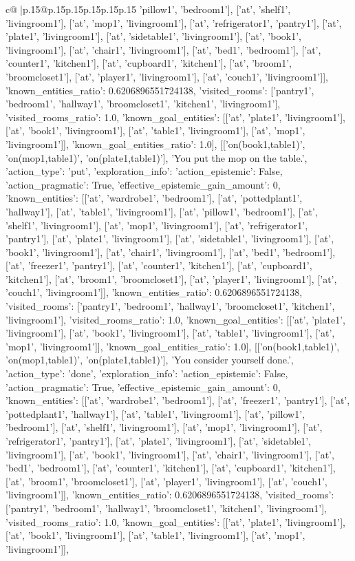 \documentclass{article}
\begin{document}
{\begin{supertabular}{c@{$\;$}|p{.15\linewidth}@{}p{.15\linewidth}p{.15\linewidth}p{.15\linewidth}p{.15\linewidth}p{.15\linewidth}}
{{{'pillow1', 'bedroom1'], ['at', 'shelf1', 'livingroom1'], ['at', 'mop1', 'livingroom1'], ['at', 'refrigerator1', 'pantry1'], ['at', 'plate1', 'livingroom1'], ['at', 'sidetable1', 'livingroom1'], ['at', 'book1', 'livingroom1'], ['at', 'chair1', 'livingroom1'], ['at', 'bed1', 'bedroom1'], ['at', 'counter1', 'kitchen1'], ['at', 'cupboard1', 'kitchen1'], ['at', 'broom1', 'broomcloset1'], ['at', 'player1', 'livingroom1'], ['at', 'couch1', 'livingroom1']], 'known_entities_ratio': 0.6206896551724138, 'visited_rooms': ['pantry1', 'bedroom1', 'hallway1', 'broomcloset1', 'kitchen1', 'livingroom1'], 'visited_rooms_ratio': 1.0, 'known_goal_entities': [['at', 'plate1', 'livingroom1'], ['at', 'book1', 'livingroom1'], ['at', 'table1', 'livingroom1'], ['at', 'mop1', 'livingroom1']], 'known_goal_entities_ratio': 1.0}}], [['on(book1,table1)', 'on(mop1,table1)', 'on(plate1,table1)'], 'You put the mop on the table.', {'action_type': 'put', 'exploration_info': {'action_epistemic': False, 'action_pragmatic': True, 'effective_epistemic_gain_amount': 0, 'known_entities': [['at', 'wardrobe1', 'bedroom1'], ['at', 'pottedplant1', 'hallway1'], ['at', 'table1', 'livingroom1'], ['at', 'pillow1', 'bedroom1'], ['at', 'shelf1', 'livingroom1'], ['at', 'mop1', 'livingroom1'], ['at', 'refrigerator1', 'pantry1'], ['at', 'plate1', 'livingroom1'], ['at', 'sidetable1', 'livingroom1'], ['at', 'book1', 'livingroom1'], ['at', 'chair1', 'livingroom1'], ['at', 'bed1', 'bedroom1'], ['at', 'freezer1', 'pantry1'], ['at', 'counter1', 'kitchen1'], ['at', 'cupboard1', 'kitchen1'], ['at', 'broom1', 'broomcloset1'], ['at', 'player1', 'livingroom1'], ['at', 'couch1', 'livingroom1']], 'known_entities_ratio': 0.6206896551724138, 'visited_rooms': ['pantry1', 'bedroom1', 'hallway1', 'broomcloset1', 'kitchen1', 'livingroom1'], 'visited_rooms_ratio': 1.0, 'known_goal_entities': [['at', 'plate1', 'livingroom1'], ['at', 'book1', 'livingroom1'], ['at', 'table1', 'livingroom1'], ['at', 'mop1', 'livingroom1']], 'known_goal_entities_ratio': 1.0}}], [['on(book1,table1)', 'on(mop1,table1)', 'on(plate1,table1)'], 'You consider yourself done.', {'action_type': 'done', 'exploration_info': {'action_epistemic': False, 'action_pragmatic': True, 'effective_epistemic_gain_amount': 0, 'known_entities': [['at', 'wardrobe1', 'bedroom1'], ['at', 'freezer1', 'pantry1'], ['at', 'pottedplant1', 'hallway1'], ['at', 'table1', 'livingroom1'], ['at', 'pillow1', 'bedroom1'], ['at', 'shelf1', 'livingroom1'], ['at', 'mop1', 'livingroom1'], ['at', 'refrigerator1', 'pantry1'], ['at', 'plate1', 'livingroom1'], ['at', 'sidetable1', 'livingroom1'], ['at', 'book1', 'livingroom1'], ['at', 'chair1', 'livingroom1'], ['at', 'bed1', 'bedroom1'], ['at', 'counter1', 'kitchen1'], ['at', 'cupboard1', 'kitchen1'], ['at', 'broom1', 'broomcloset1'], ['at', 'player1', 'livingroom1'], ['at', 'couch1', 'livingroom1']], 'known_entities_ratio': 0.6206896551724138, 'visited_rooms': ['pantry1', 'bedroom1', 'hallway1', 'broomcloset1', 'kitchen1', 'livingroom1'], 'visited_rooms_ratio': 1.0, 'known_goal_entities': [['at', 'plate1', 'livingroom1'], ['at', 'book1', 'livingroom1'], ['at', 'table1', 'livingroom1'], ['at', 'mop1', 'livingroom1']], }}}
\end{supertabular}}
\end{document}
